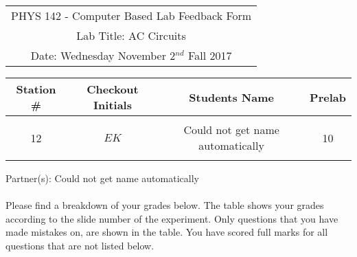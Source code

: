 \documentclass{article}
\begin{document}

\begin{table}[h]
	\centering
	\begin{tabular}{c}
	PHYS 142 - Computer Based Lab Feedback Form\\
	Lab Title: AC Circuits\\Date: Wednesday November 2$^{nd}$ Fall 2017 \\\hline
\end{tabular}
\end{table}
\begin{table}[h]\centering \begin{tabular}{|c|c|p{9.9 cm}|c|}\hline Station \#  & Checkout Initials & \multicolumn{1}{|c|}{Students Name} & Prelab \\\hline\multirow{3}{*}{12}& \multirow{3}{*}{$EK$} & &\\& &\multicolumn{1}{|c|}{Could not get name automatically}&10\\&   &  &\\\hline
\end{tabular}
\end{table}
Partner(s): Could not get name automatically\\
\\Please find a breakdown of your grades below. The table shows your grades according to the slide number of the experiment. Only questions that you have made mistakes on, are shown in the table. You have scored full marks for all questions that are not listed below.
\end{document}
